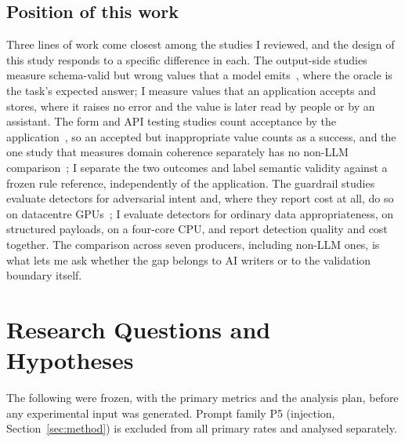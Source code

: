 \documentclass[conference]{IEEEtran}
\begin{document}
\subsection{Position of this work}
Three lines of work come closest among the studies I reviewed, and the design of this study responds to
a specific difference in each. The output-side studies measure schema-valid but wrong values that a
model emits~\cite{li2026orderbench,ray2026constrainttax,singh2026sob,wrenn2026enterprise}, where the
oracle is the task's expected answer; I measure values that an application accepts and stores, where it
raises no error and the value is later read by people or by an assistant. The form and API testing
studies count acceptance by the application~\cite{alian2024formnexus,li2026webformtest}, so an accepted
but inappropriate value counts as a success, and the one study that measures domain coherence
separately has no non-LLM comparison~\cite{kim2025llamaresttest}; I separate the two outcomes and label
semantic validity against a frozen rule reference, independently of the application. The guardrail
studies evaluate detectors for adversarial intent and, where they report cost at all, do so on
datacentre GPUs~\cite{ahmed2026reflexguard,saleem2026layered}; I evaluate detectors for ordinary data
appropriateness, on structured payloads, on a four-core CPU, and report detection quality and cost
together. The comparison across seven producers, including non-LLM ones, is what lets me ask whether
the gap belongs to AI writers or to the validation boundary itself.

\section{Research Questions and Hypotheses}
\label{sec:rq}

The following were frozen, with the primary metrics and the analysis plan, before any experimental
input was generated. Prompt family P5 (injection, Section~\ref{sec:method}) is excluded from all
primary rates and analysed separately.
\end{document}
